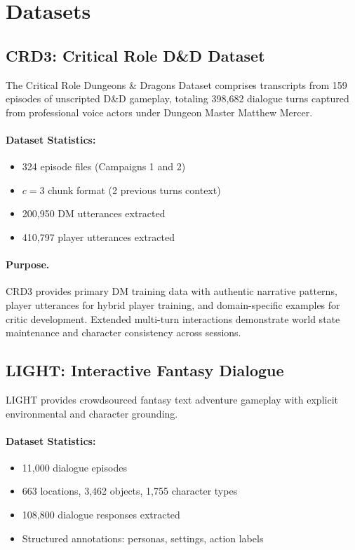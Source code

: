 \documentclass[11pt]{article}
\begin{document}
\section{Datasets}

\subsection{CRD3: Critical Role D\&D Dataset}

The Critical Role Dungeons \& Dragons Dataset \cite{rameshkumar2020storytelling} comprises transcripts from 159 episodes of unscripted D\&D gameplay, totaling 398,682 dialogue turns captured from professional voice actors under Dungeon Master Matthew Mercer.

\paragraph{Dataset Statistics:}
\begin{itemize}
\item 324 episode files (Campaigns 1 and 2)
\item $c=3$ chunk format (2 previous turns context)
\item 200,950 DM utterances extracted
\item 410,797 player utterances extracted
\end{itemize}

\paragraph{Purpose.} CRD3 provides primary DM training data with authentic narrative patterns, player utterances for hybrid player training, and domain-specific examples for critic development. Extended multi-turn interactions demonstrate world state maintenance and character consistency across sessions.

\subsection{LIGHT: Interactive Fantasy Dialogue}

LIGHT \cite{urbanek2019learning} provides crowdsourced fantasy text adventure gameplay with explicit environmental and character grounding.

\paragraph{Dataset Statistics:}
\begin{itemize}
\item 11,000 dialogue episodes
\item 663 locations, 3,462 objects, 1,755 character types
\item 108,800 dialogue responses extracted
\item Structured annotations: personas, settings, action labels
\end{itemize}
\end{document}
